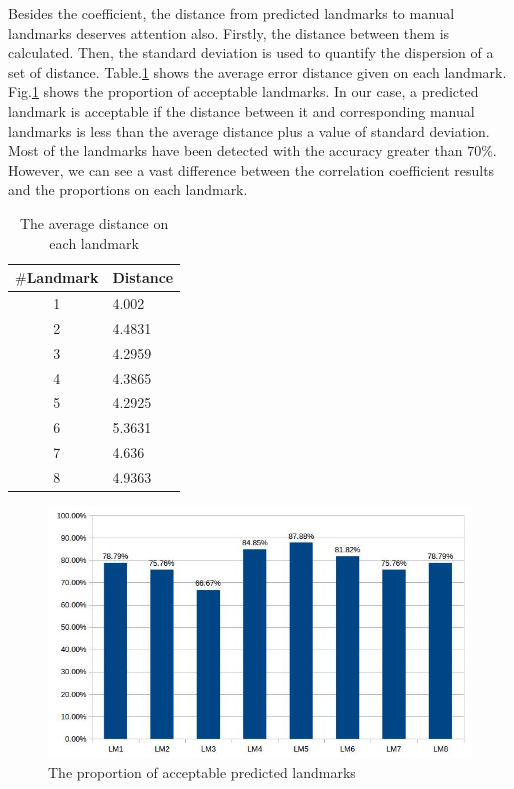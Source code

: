 \documentclass[conference]{IEEEtran}
\begin{document}
Besides the coefficient, the distance from predicted landmarks to manual landmarks deserves attention also. Firstly, the distance between them is calculated. Then, the standard deviation is used to quantify the dispersion of a set of distance. Table.\ref{tab2} shows the average error distance given on each landmark. Fig.\ref{figchart} shows the proportion of acceptable landmarks. In our case, a predicted landmark is acceptable if the distance between it and corresponding manual landmarks is less than the average distance plus a value of standard deviation. Most of the landmarks have been detected with the accuracy greater than $70\%$. However, we can see a vast difference between the correlation coefficient results and the proportions on each landmark.

\begin{table}[htbp]
\caption{The average distance on each landmark}
\begin{center}
\begin{tabular}{|c|p{1.5cm}|}
\hline
\textbf{$\#$Landmark} & \textbf{Distance} \\ \hline
1 & 4.002  \\ \hline
2 & 4.4831 \\ \hline
3 & 4.2959 \\ \hline
4 & 4.3865 \\ \hline
5 & 4.2925 \\ \hline
6 & 5.3631 \\ \hline
7 & 4.636 \\ \hline
8 & 4.9363 \\ \hline
\end{tabular}
\label{tab2}
\end{center}
\end{table}

\begin{figure}[htbp]
	\centerline{\includegraphics[scale=0.35]{images/pronotum_pmodel_statistic}}
	\caption{The proportion of acceptable predicted landmarks}
	\label{figchart}
\end{figure}
\end{document}
